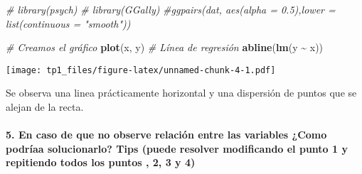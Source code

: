 \documentclass[
]{article}
\newenvironment{Shaded}{\begin{snugshade}}{\end{snugshade}}
\newcommand{\CommentTok}[1]{\textcolor[rgb]{0.56,0.35,0.01}{\textit{#1}}}
\newcommand{\FunctionTok}[1]{\textcolor[rgb]{0.13,0.29,0.53}{\textbf{#1}}}
\newcommand{\NormalTok}[1]{#1}
\newcommand{\SpecialCharTok}[1]{\textcolor[rgb]{0.81,0.36,0.00}{\textbf{#1}}}
\begin{document}
\begin{Shaded}
\begin{Highlighting}[]
\CommentTok{\# library(psych)}
\CommentTok{\# library(GGally)}
\CommentTok{\#ggpairs(dat, aes(alpha = 0.5),lower = list(continuous = "smooth"))}

\CommentTok{\# Creamos el gráfico}
\FunctionTok{plot}\NormalTok{(x, y)}
\CommentTok{\# Línea de regresión}
\FunctionTok{abline}\NormalTok{(}\FunctionTok{lm}\NormalTok{(y }\SpecialCharTok{\textasciitilde{}}\NormalTok{ x))}
\end{Highlighting}
\end{Shaded}

\texttt{[image: tp1\_files/figure-latex/unnamed-chunk-4-1.pdf]}

Se observa una linea prácticamente horizontal y una dispersión de puntos
que se alejan de la recta.

\hypertarget{en-caso-de-que-no-observe-relaciuxf3n-entre-las-variables-como-podruxedaa-solucionarlo-tips-puede-resolver-modificando-el-punto-1-y-repitiendo-todos-los-puntos-2-3-y-4}{%
\paragraph{5. En caso de que no observe relación entre las variables
¿Como podríaa solucionarlo? Tips (puede resolver modificando el punto 1
y repitiendo todos los puntos , 2, 3 y
4)}\label{en-caso-de-que-no-observe-relaciuxf3n-entre-las-variables-como-podruxedaa-solucionarlo-tips-puede-resolver-modificando-el-punto-1-y-repitiendo-todos-los-puntos-2-3-y-4}}
\end{document}
